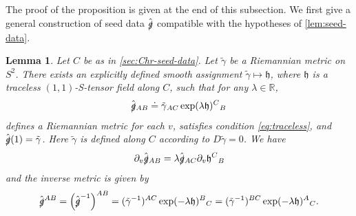 \documentclass[10pt]{article}
\numberwithin{equation}{section}
\theoremstyle{plain}
\newtheorem{lem}{Lemma}[section]
\theoremstyle{definition}
\renewcommand{\Bbb}{\mathbb}
\begin{document}
The proof of the proposition is given at the end of this subsection. We first give a general construction of seed data $\hat{\slashed g}$ compatible with the hypotheses of \cref{lem:seed-data}.

\begin{lem}\label{lem:mathfrak-h}
    Let $C$ be as in \cref{sec:Chr-seed-data}. Let $\tilde \gamma$ be a Riemannian metric on $S^2$. There exists an explicitly defined smooth assignment $\tilde\gamma\mapsto \mathfrak h$, where $\mathfrak h$ is a traceless $(1,1)$-S-tensor field along $C$, such that for any $\lambda\in\Bbb R$,  \begin{equation}
         \hat{\slashed g}{}_{AB}\doteq \tilde{\gamma}{}_{AC}\exp(\lambda\mathfrak h)^C{}_B \label{defn:g-hat}
     \end{equation}
     defines a Riemannian metric for each $v$, satisfies condition \eqref{eq:traceless}, and $\hat{\slashed g}(1)=\tilde\gamma$. Here $\tilde\gamma$ is defined along $C$ according to $D\tilde\gamma=0$. We have
     \begin{equation}
    \partial_v \hat{\slashed g}{}_{AB} = \lambda \hat{\slashed g}{}_{AC} \partial_v \mathfrak h^C{}_B  \label{eq:D-g-slash-hat}
\end{equation}
and the inverse metric is given by 
\begin{equation}
    \hat{\slashed g}{}^{AB} = \left(\hat{\slashed g}^{-1}\right)^{AB}=({\tilde\gamma}^{-1})^{AC} \exp(-\lambda\mathfrak h)^B{}_C = ({\tilde\gamma}^{-1})^{BC} \exp(-\lambda\mathfrak h)^A{}_C.\label{eq:matrix-inverse}
\end{equation}
\end{lem}
\end{document}
